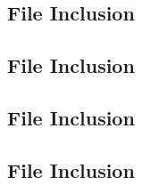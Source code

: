 \documentclass[11pt]{article}
\newcommand{\Verilog}[2][]{%
	
}
\begin{document}
    \subsection*{File Inclusion}
    \Verilog[caption=anode decoder Verilog code,label=code:file_ex]{anode_decoder.sv}

    \subsection*{File Inclusion}
    \Verilog[caption=anode decoder Test Benches Verilog code,label=code:file_ex]{anode_decoder_test.sv}


    \subsection*{File Inclusion}
    \Verilog[caption=sseg4 Verilog code,label=code:file_ex]{sseg4.sv}

    \subsection*{File Inclusion}
    \Verilog[caption=sseg4 manual Verilog code,label=code:file_ex]{sseg4_manual.sv}
\end{document}
